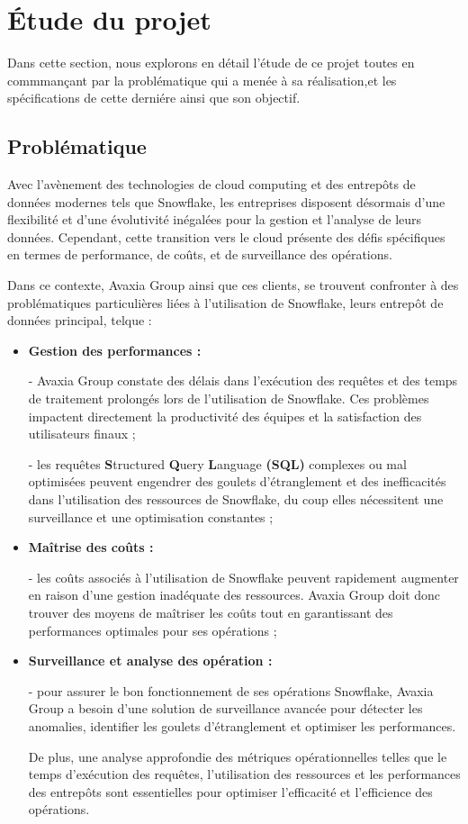 \section{\'Etude du projet}
\par Dans cette section, nous explorons en détail l'étude de ce projet toutes en commmançant par la problématique qui a menée à sa réalisation,et les spécifications de cette derniére ainsi que son objectif.
\subsection{Problématique}
\par Avec l'avènement des technologies de cloud computing et des entrepôts de données modernes tels que Snowflake, les entreprises disposent désormais d'une flexibilité 
et d'une évolutivité inégalées pour la gestion et l'analyse de leurs données. 
Cependant, cette transition vers le cloud présente des défis spécifiques en termes de performance, de coûts, et de surveillance des opérations. 
\par Dans ce contexte, Avaxia Group ainsi que ces clients, se trouvent confronter à des problématiques particulières liées à l'utilisation de Snowflake, leurs entrepôt de données principal, telque : 
\begin{itemize}
    \item \textbf{Gestion des performances : } \par - Avaxia Group constate des délais dans l'exécution des requêtes et des temps de traitement prolongés lors de l'utilisation de Snowflake. 
    Ces problèmes impactent directement la productivité des équipes et la satisfaction des utilisateurs finaux ;

    \par - les requêtes \textbf{S}tructured \textbf{Q}uery \textbf{L}anguage \textbf{(SQL)} complexes ou mal optimisées peuvent engendrer des goulets d'étranglement et des inefficacités dans l'utilisation des ressources de Snowflake, du coup elles
    nécessitent une surveillance et une optimisation constantes ;

    \item \textbf{Maîtrise des coûts :} \par - les coûts associés à l'utilisation de Snowflake peuvent rapidement augmenter en raison d'une gestion inadéquate des ressources. 
    Avaxia Group doit donc trouver des moyens de maîtriser les coûts tout en garantissant des performances optimales pour ses opérations ;

    \item \textbf{Surveillance et analyse des opération :} \par - pour assurer le bon fonctionnement de ses opérations Snowflake, Avaxia Group a besoin d'une solution de surveillance avancée pour détecter les anomalies, identifier les goulets d'étranglement et optimiser les performances.
    \par De plus, une analyse approfondie des métriques opérationnelles telles que le temps d'exécution des requêtes, l'utilisation des ressources et les performances des entrepôts sont essentielles pour optimiser l'efficacité et l'efficience des opérations. 
\end{itemize}

